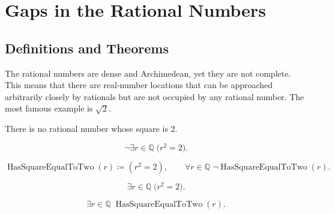 
\section{Gaps in the Rational Numbers}
\label{sec:gaps-in-q}

\subsection{Definitions and Theorems}

The rational numbers are dense and Archimedean, yet they are not complete.  This means that there
are real-number locations that can be approached arbitrarily closely by rationals but are not
occupied by any rational number.  The most famous example is $\sqrt{2}$.

\begin{tcolorbox}[colback=thmbox, colframe=thmborder, arc=2pt,
  left=6pt, right=6pt, top=4pt, bottom=4pt,
  title={\small\textbf{Theorem (No Rational Number Has Square $2$)}},
  fonttitle=\small\bfseries]
\begin{theorem}
\label{thm:sqrt2-irrational}
There is no rational number whose square is $2$.
\end{theorem}
\end{tcolorbox}

\begin{remark*}
\[
\neg\exists r\in\mathbb{Q}\;\bigl(r^2=2\bigr).
\]
\end{remark*}

\begin{remark*}
\[
\operatorname{HasSquareEqualToTwo}(r)\coloneqq (r^2=2),
\qquad
\forall r\in\mathbb{Q}\;\neg\operatorname{HasSquareEqualToTwo}(r).
\]
\end{remark*}

\begin{remark*}
\[
\exists r\in\mathbb{Q}\;\bigl(r^2=2\bigr).
\]
\end{remark*}

\begin{remark*}
\[
\exists r\in\mathbb{Q}\;\operatorname{HasSquareEqualToTwo}(r).
\]
\end{remark*}

